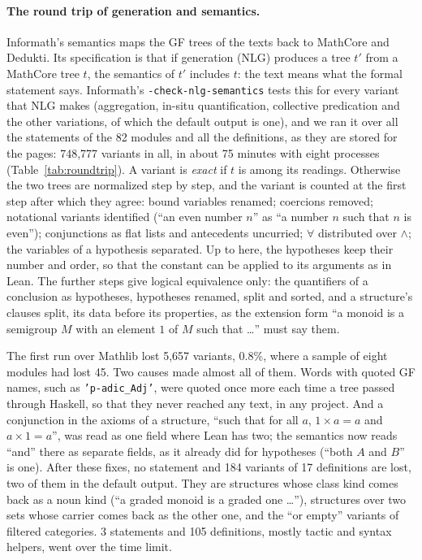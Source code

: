 \documentclass{easychair}
\newcommand{\ttt}[1]{\texttt{#1}}
\begin{document}
\paragraph{The round trip of generation and semantics.}
\label{sec:roundtrip}
Informath's semantics maps the GF trees of the texts back to MathCore and Dedukti. Its
specification is that if generation (NLG) produces a tree $t'$ from a MathCore tree $t$, the
semantics of $t'$ includes $t$: the text means what the formal statement says. Informath's
\ttt{-check-nlg-semantics} tests this for every variant that NLG makes (aggregation, in-situ
quantification, collective predication and the other variations, of which the default output is
one), and we ran it over all the statements of the 82 modules and all the definitions, as they
are stored for the pages: 748,777 variants in all, in about 75 minutes with eight processes
(Table~\ref{tab:roundtrip}). A variant is \emph{exact} if $t$ is among its readings. Otherwise
the two trees are normalized step by step, and the variant is counted at the first step after
which they agree: bound variables renamed; coercions removed; notational variants identified
(``an even number $n$'' as ``a number $n$ such that $n$ is even''); conjunctions as flat lists
and antecedents uncurried; $\forall$ distributed over $\wedge$; the variables of a hypothesis
separated. Up to here, the hypotheses keep their number and order, so that the constant can be
applied to its arguments as in Lean. The further steps give logical equivalence only: the
quantifiers of a conclusion as hypotheses, hypotheses renamed, split and sorted, and a
structure's clauses split, its data before its properties, as the extension form ``a monoid is
a semigroup $M$ with an element $1$ of $M$ such that \ldots'' must say them.

The first run over Mathlib lost 5,657 variants, 0.8\%, where a sample of eight modules had
lost 45. Two causes made almost all of them. Words with quoted GF names, such as
\ttt{'p-adic\_Adj'}, were quoted once more each time a tree passed through Haskell, so that
they never reached any text, in any project. And a conjunction in the axioms of a structure,
``such that for all $a$, $1 \times a = a$ and $a \times 1 = a$'', was read as one field where
Lean has two; the semantics now reads ``and'' there as separate fields, as it already did for
hypotheses (``both $A$ and $B$'' is one). After these fixes, no statement and 184 variants of 17
definitions are lost, two of them in the default output. They are structures whose class kind
comes back as a noun kind (``a graded monoid is a graded one \ldots''), structures over two sets
whose carrier comes back as the other one, and the ``or empty'' variants of filtered
categories. 3 statements and 105 definitions, mostly tactic and syntax helpers, went over the
time limit.
\end{document}
